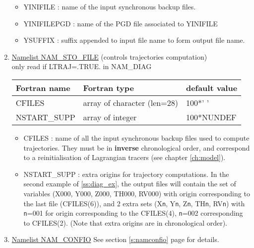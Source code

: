\begin{enumerate}
\begin{itemize}
\item YINIFILE : name of the input synchronous backup files.
\item YINIFILEPGD : name of the PGD file associated to YINIFILE

\item YSUFFIX : suffix appended to input file name to form output file name.
\end{itemize}

\item\underline{Namelist NAM\_STO\_FILE} (controls trajectories computation) \\
only read if LTRAJ=.TRUE. in NAM\_DIAG
\begin{center}
\begin{tabular} {|l|l|l|}
\hline
Fortran name & Fortran type & default value\\
\hline
CFILES        & array of character (len=28)  & 100*' '   \\
NSTART\_SUPP  & array of integer  & 100*NUNDEF   \\
\hline
\end{tabular}
\end{center}

\begin{itemize}
\item CFILES : name of all the input synchronous backup files used to compute 
trajectories. They must be in {\bf inverse} chronological order, and correspond
to a reinitialisation of Lagrangian tracers (see chapter \ref{ch:model}).
\item NSTART\_SUPP : extra origins for trajectory computations. In the second 
example of \ref{ss:diag_ex}, the output files will contain the set of variables
(X000, Y000, Z000, TH000, RV000) with origin corresponding to the last file
(CFILES(6)), and 2 extra sets (X{\tt n}, Y{\tt n}, Z{\tt n}, TH{\tt n}, 
RV{\tt n}) with {\tt n}=001 for origin corresponding to the CFILES(4),
{\tt n}=002 corresponding to CFILES(2). (Note that extra origins are in
chronological order).

\end{itemize}

\item\underline{Namelist NAM\_CONFIO}
See section \ref{s:namconfio} page \pageref{s:namconfio} for details.


\end{enumerate}
